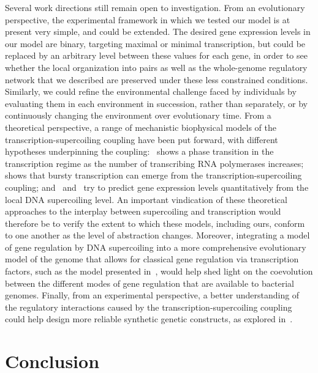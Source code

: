Several work directions still remain open to investigation.
From an evolutionary perspective, the experimental framework in which we tested our model is at present very simple, and could be extended.
The desired gene expression levels in our model are binary, targeting maximal or minimal transcription, but could be replaced by an arbitrary level between these values for each gene, in order to see whether the local organization into pairs as well as the whole-genome regulatory network that we described are preserved under these less constrained conditions.
Similarly, we could refine the environmental challenge faced by individuals by evaluating them in each environment in succession, rather than separately, or by continuously changing the environment over evolutionary time.
From a theoretical perspective, a range of mechanistic biophysical models of the transcription-supercoiling coupling have been put forward, with different hypotheses underpinning the coupling:~\cite{brackley2016} shows a phase transition in the transcription regime as the number of transcribing RNA polymerases increases;~\cite{sevier2021} shows that bursty transcription can emerge from the transcription-supercoiling coupling; and~\cite{meyer2014} and~\cite{elhoudaigui2019} try to predict gene expression levels quantitatively from the local DNA supercoiling level.
An important vindication of these theoretical approaches to the interplay between supercoiling and transcription would therefore be to verify the extent to which these models, including ours, conform to one another as the level of abstraction changes.
Moreover, integrating a model of gene regulation by DNA supercoiling into a more comprehensive evolutionary model of the genome that allows for classical gene regulation via transcription factors, such as the model presented in~\cite{crombach2008}, would help shed light on the coevolution between the different modes of gene regulation that are available to bacterial genomes.
Finally, from an experimental perspective, a better understanding of the regulatory interactions caused by the transcription-supercoiling coupling could help design more reliable synthetic genetic constructs, as explored in~\cite{johnstone2022}.


\section{Conclusion}

